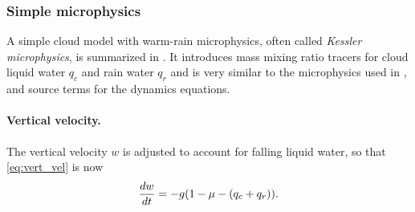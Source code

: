 %


\subsubsection{Simple microphysics}

A simple cloud model with warm-rain microphysics, often called \emph{Kessler microphysics}, is summarized in \cite[ch.~15]{RogersYau}.
It introduces mass mixing ratio tracers for cloud liquid water $q_c$ and rain water $q_r$ and is very similar to the microphysics used in \cite{SoongOgura1973,KlempWilhelmson1978}, and source terms for the dynamics equations.

\paragraph{Vertical velocity.} The vertical velocity $w$ is adjusted to account for falling liquid water, so that \eqref{eq:vert_vel} is now
\begin{equation*}
  \frac{ d w}{d t} = -g(1-\mu -(q_c+q_r)).  
\end{equation*}


